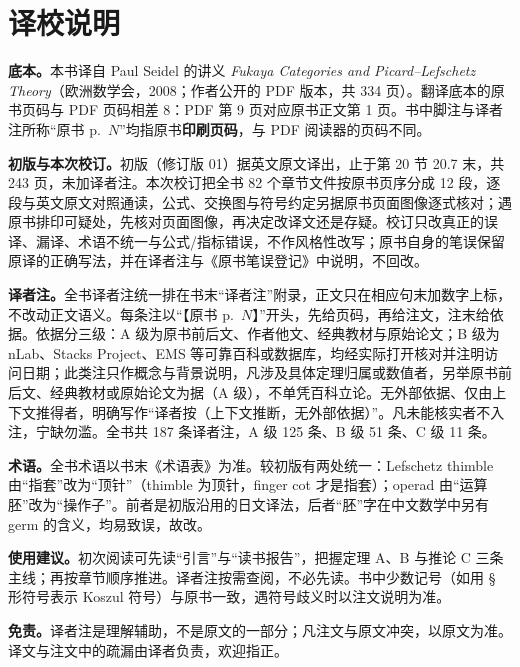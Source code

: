 \chapter*{译校说明}

\noindent\small
\textbf{底本。}本书译自 Paul Seidel 的讲义 \emph{Fukaya Categories and Picard--Lefschetz Theory}（欧洲数学会，2008；作者公开的 PDF 版本，共 334 页）。翻译底本的原书页码与 PDF 页码相差 8：PDF 第 9 页对应原书正文第 1 页。书中脚注与译者注所称“原书 p.~$N$”均指原书\textbf{印刷页码}，与 PDF 阅读器的页码不同。

\textbf{初版与本次校订。}初版（修订版 01）据英文原文译出，止于第 20 节 20.7 末，共 243 页，未加译者注。本次校订把全书 82 个章节文件按原书页序分成 12 段，逐段与英文原文对照通读，公式、交换图与符号约定另据原书页面图像逐式核对；遇原书排印可疑处，先核对页面图像，再决定改译文还是存疑。校订只改真正的误译、漏译、术语不统一与公式/指标错误，不作风格性改写；原书自身的笔误保留原译的正确写法，并在译者注与《原书笔误登记》中说明，不回改。

\textbf{译者注。}全书译者注统一排在书末“译者注”附录，正文只在相应句末加数字上标，不改动正文语义。每条注以“【原书 p.~$N$】”开头，先给页码，再给注文，注末给依据。依据分三级：A 级为原书前后文、作者他文、经典教材与原始论文；B 级为 nLab、Stacks Project、EMS 等可靠百科或数据库，均经实际打开核对并注明访问日期；此类注只作概念与背景说明，凡涉及具体定理归属或数值者，另举原书前后文、经典教材或原始论文为据（A 级），不单凭百科立论。无外部依据、仅由上下文推得者，明确写作“译者按（上下文推断，无外部依据）”。凡未能核实者不入注，宁缺勿滥。全书共 187 条译者注，A 级 125 条、B 级 51 条、C 级 11 条。

\textbf{术语。}全书术语以书末《术语表》为准。较初版有两处统一：Lefschetz thimble 由“指套”改为“顶针”（thimble 为顶针，finger cot 才是指套）；operad 由“运算胚”改为“操作子”。前者是初版沿用的日文译法，后者“胚”字在中文数学中另有 germ 的含义，均易致误，故改。

\textbf{使用建议。}初次阅读可先读“引言”与“读书报告”，把握定理 A、B 与推论 C 三条主线；再按章节顺序推进。译者注按需查阅，不必先读。书中少数记号（如用 \S{} 形符号表示 Koszul 符号）与原书一致，遇符号歧义时以注文说明为准。

\textbf{免责。}译者注是理解辅助，不是原文的一部分；凡注文与原文冲突，以原文为准。译文与注文中的疏漏由译者负责，欢迎指正。
\normalsize

